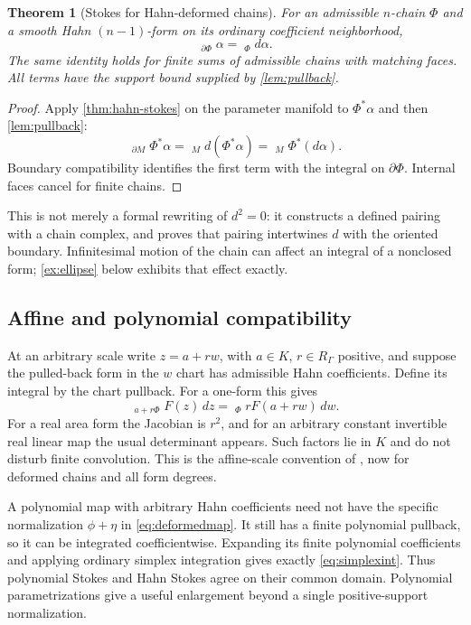 \documentclass[11pt,letterpaper]{article}
\newtheorem{theorem}{Theorem}[section]
\theoremstyle{definition}
\theoremstyle{remark}
\newcommand{\HInt}{\mathop{\int^{\!H}}\nolimits}\newcommand{\HCoint}{\mathop{\oint^{\!H}}\nolimits}
\numberwithin{equation}{section}
\begin{document}
\begin{theorem}[Stokes for Hahn-deformed chains]\label{thm:deformed-stokes}
For an admissible $n$-chain $\Phi$ and a smooth Hahn $(n-1)$-form on its ordinary coefficient neighborhood,
\begin{equation}\label{eq:deformedstokes}
 \boxed{\qquad\HInt_{\partial\Phi}\alpha
       =\HInt_\Phi d\alpha.\qquad}
\end{equation}
The same identity holds for finite sums of admissible chains with matching faces. All terms have the support bound supplied by \cref{lem:pullback}.
\end{theorem}
\begin{proof}
Apply \cref{thm:hahn-stokes} on the parameter manifold to $\Phi^*\alpha$ and then \cref{lem:pullback}:
\[
 \HInt_{\partial M}\Phi^*\alpha
 =\HInt_M d(\Phi^*\alpha)
 =\HInt_M\Phi^*(d\alpha).
\]
Boundary compatibility identifies the first term with the integral on $\partial\Phi$. Internal faces cancel for finite chains.
\end{proof}

This is not merely a formal rewriting of $d^2=0$: it constructs a defined pairing with a chain complex, and proves that pairing intertwines $d$ with the oriented boundary. Infinitesimal motion of the chain can affect an integral of a nonclosed form; \cref{ex:ellipse} below exhibits that effect exactly.

\subsection{Affine and polynomial compatibility}
At an arbitrary scale write $z=a+rw$, with $a\in K$, $r\in R_\Gamma$ positive, and suppose the pulled-back form in the $w$ chart has admissible Hahn coefficients. Define its integral by the chart pullback. For a one-form this gives
\[
 \HInt_{a+r\Phi}F(z)\,dz
 =\HInt_\Phi rF(a+rw)\,dw.
\]
For a real area form the Jacobian is $r^2$, and for an arbitrary constant invertible real linear map the usual determinant appears. Such factors lie in $K$ and do not disturb finite convolution. This is the affine-scale convention of \cite{Analysis}, now for deformed chains and all form degrees.

A polynomial map with arbitrary Hahn coefficients need not have the specific normalization $\phi+\eta$ in \eqref{eq:deformedmap}. It still has a finite polynomial pullback, so it can be integrated coefficientwise. Expanding its finite polynomial coefficients and applying ordinary simplex integration gives exactly \eqref{eq:simplexint}. Thus polynomial Stokes and Hahn Stokes agree on their common domain. Polynomial parametrizations give a useful enlargement beyond a single positive-support normalization.
\end{document}
